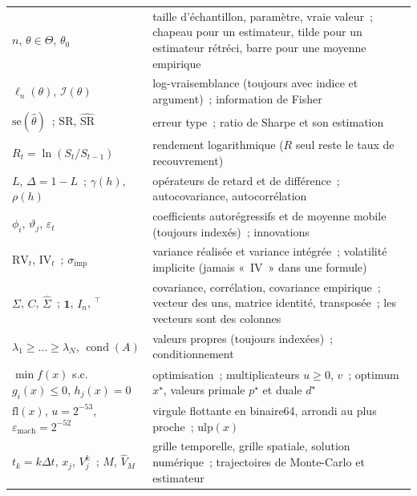 \begin{notation}\label{not:qm:probability-at-speed:stat}
\leavevmode\par\smallskip\noindent
{\small
\begin{tabular}{@{}p{4.3cm}p{9.7cm}@{}}
\toprule
$n$, $\theta \in \Theta$, $\theta_0$ & taille d'échantillon, paramètre, vraie valeur~; chapeau pour un estimateur, tilde pour un estimateur rétréci, barre pour une moyenne empirique \\
$\ell_n(\theta)$, $\mathcal I(\theta)$ & log-vraisemblance (toujours avec indice et argument)~; information de Fisher \\
$\mathrm{se}(\hat\theta)$~; $\mathrm{SR}$, $\widehat{\mathrm{SR}}$ & erreur type~; ratio de Sharpe et son estimation \\
$R_t = \ln(S_t/S_{t-1})$ & rendement logarithmique ($R$ seul reste le taux de recouvrement) \\
$L$, $\Delta = 1 - L$~; $\gamma(h)$, $\rho(h)$ & opérateurs de retard et de différence~; autocovariance, autocorrélation \\
$\phi_i$, $\vartheta_j$, $\varepsilon_t$ & coefficients autorégressifs et de moyenne mobile (toujours indexés)~; innovations \\
$\mathrm{RV}_t$, $\mathrm{IV}_t$~; $\sigma_{\mathrm{imp}}$ & variance réalisée et variance intégrée~; volatilité implicite (jamais «~IV~» dans une formule) \\
$\Sigma$, $C$, $\hat\Sigma$~; $\mathbf 1$, $I_n$, ${}^\top$ & covariance, corrélation, covariance empirique~; vecteur des uns, matrice identité, transposée~; les vecteurs sont des colonnes \\
$\lambda_1 \ge \dots \ge \lambda_N$, $\operatorname{cond}(A)$ & valeurs propres (toujours indexées)~; conditionnement \\
$\min f(x)$ s.c.\ $g_i(x) \le 0$, $h_j(x) = 0$ & optimisation~; multiplicateurs $u \ge 0$, $v$~; optimum $x^\star$, valeurs primale $p^\star$ et duale $d^\star$ \\
$\mathrm{fl}(x)$, $u = 2^{-53}$, $\varepsilon_{\mathrm{mach}} = 2^{-52}$ & virgule flottante en binaire64, arrondi au plus proche~; $\mathrm{ulp}(x)$ \\
$t_k = k\Delta t$, $x_j$, $V^k_j$~; $M$, $\hat V_M$ & grille temporelle, grille spatiale, solution numérique~; trajectoires de Monte-Carlo et estimateur \\
\bottomrule
\end{tabular}}
\end{notation}

